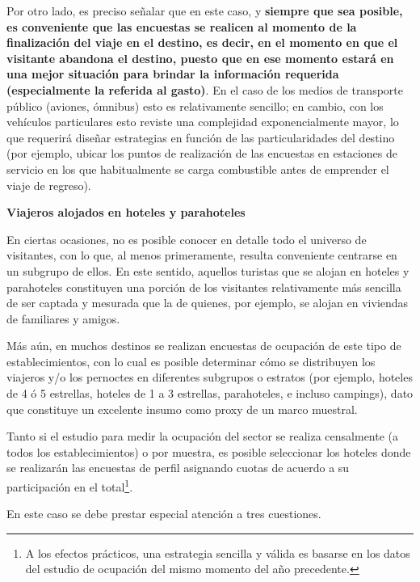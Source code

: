 \documentclass[
]{book}
\begin{document}
Por otro lado, es preciso señalar que en este caso, y \textbf{siempre que sea posible, es conveniente que las encuestas se realicen al momento de la finalización del viaje en el destino, es decir, en el momento en que el visitante abandona el destino, puesto que en ese momento estará en una mejor situación para brindar la información requerida (especialmente la referida al gasto)}. En el caso de los medios de transporte público (aviones, ómnibus) esto es relativamente sencillo; en cambio, con los vehículos particulares esto reviste una complejidad exponencialmente mayor, lo que requerirá diseñar estrategias en función de las particularidades del destino (por ejemplo, ubicar los puntos de realización de las encuestas en estaciones de servicio en los que habitualmente se carga combustible antes de emprender el viaje de regreso).

\textbf{Viajeros alojados en hoteles y parahoteles}

En ciertas ocasiones, no es posible conocer en detalle todo el universo de visitantes, con lo que, al menos primeramente, resulta conveniente centrarse en un subgrupo de ellos. En este sentido, aquellos turistas que se alojan en hoteles y parahoteles constituyen una porción de los visitantes relativamente más sencilla de ser captada y mesurada que la de quienes, por ejemplo, se alojan en viviendas de familiares y amigos.

Más aún, en muchos destinos se realizan encuestas de ocupación de este tipo de establecimientos, con lo cual es posible determinar cómo se distribuyen los viajeros y/o los pernoctes en diferentes subgrupos o estratos (por ejemplo, hoteles de 4 ó 5 estrellas, hoteles de 1 a 3 estrellas, parahoteles, e incluso campings), dato que constituye un excelente insumo como proxy de un marco muestral.

Tanto si el estudio para medir la ocupación del sector se realiza censalmente (a todos los establecimientos) o por muestra, es posible seleccionar los hoteles donde se realizarán las encuestas de perfil asignando cuotas de acuerdo a su participación en el total\footnote{A los efectos prácticos, una estrategia sencilla y válida es basarse en los datos del estudio de ocupación del mismo momento del año precedente.}.

En este caso se debe prestar especial atención a tres cuestiones.
\end{document}
